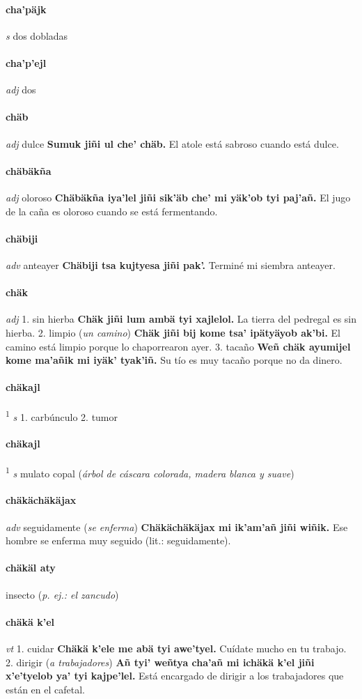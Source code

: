 \documentclass{scrbook}
\newcommand{\entry}[1]{\paragraph{#1}}
\newcommand{\onedefinition}[1]{#1.}
\newcommand{\defsuperscript}[1]{\textsuperscript{1}}
\newcommand{\partofspeech}[1]{\textit{#1}}
\newcommand{\spanishtranslation}[1]{#1}
\newcommand{\clarification}[1]{(\textit{#1})}
\newcommand{\cholexample}[1]{\textbf{#1}}
\newcommand{\exampletranslation}[1]{#1}
\newcommand{\secondtranslation}[1]{#1}
\begin{document}
\begin{multicols}{2}
\entry{cha'päjk}
\partofspeech{s}
\spanishtranslation{dos dobladas}

\entry{cha'p'ejl}
\partofspeech{adj}
\spanishtranslation{dos}

\entry{chäb}
\partofspeech{adj}
\spanishtranslation{dulce}
\cholexample{Sumuk jiñi ul che' chäb.}
\exampletranslation{El atole está sabroso cuando está dulce.}

\entry{chäbäkña}
\partofspeech{adj}
\spanishtranslation{oloroso}
\cholexample{Chäbäkña iya'lel jiñi sik'äb che' mi yäk'ob tyi paj'añ.}
\exampletranslation{El jugo de la caña es oloroso cuando se está fermentando.}

\entry{chäbiji}
\partofspeech{adv}
\spanishtranslation{anteayer}
\cholexample{Chäbiji tsa kujtyesa jiñi pak'.}
\exampletranslation{Terminé mi siembra anteayer.}

\entry{chäk}
\partofspeech{adj}
\onedefinition{1}
\spanishtranslation{sin hierba}
\cholexample{Chäk jiñi lum ambä tyi xajlelol.}
\exampletranslation{La tierra del pedregal es sin hierba.}
\onedefinition{2}
\spanishtranslation{limpio}
\clarification{un camino}
\cholexample{Chäk jiñi bij kome tsa' ipätyäyob ak'bi.}
\exampletranslation{El camino está limpio porque lo chaporrearon ayer.}
\onedefinition{3}
\secondtranslation{tacaño}
\cholexample{Weñ chäk ayumijel kome ma'añik mi iyäk' tyak'iñ.}
\exampletranslation{Su tío es muy tacaño porque no da dinero.}

\entry{chäkajl}
\defsuperscript{1}
\partofspeech{s}
\onedefinition{1}
\spanishtranslation{carbúnculo}
\onedefinition{2}
\spanishtranslation{tumor}

\entry{chäkajl}
\defsuperscript{2}
\partofspeech{s}
\spanishtranslation{mulato}
\spanishtranslation{copal}
\clarification{árbol de cáscara colorada, madera blanca y suave}

\entry{chäkächäkäjax}
\partofspeech{adv}
\spanishtranslation{seguidamente}
\clarification{se enferma}
\cholexample{Chäkächäkäjax mi ik'am'añ jiñi wiñik.}
\exampletranslation{Ese hombre se enferma muy seguido (lit.: seguidamente).}

\entry{chäkäl aty}
\spanishtranslation{insecto}
\clarification{p. ej.: el zancudo}

\entry{chäkä k'el}
\partofspeech{vt}
\onedefinition{1}
\spanishtranslation{cuidar}
\cholexample{Chäkä k'ele me abä tyi awe'tyel.}
\exampletranslation{Cuídate mucho en tu trabajo.}
\onedefinition{2}
\spanishtranslation{dirigir}
\clarification{a trabajadores}
\cholexample{Añ tyi' weñtya cha'añ mi ichäkä k'el jiñi x'e'tyelob ya' tyi kajpe'lel.}
\exampletranslation{Está encargado de dirigir a los trabajadores que están en el cafetal.}


\end{multicols}
\end{document}
